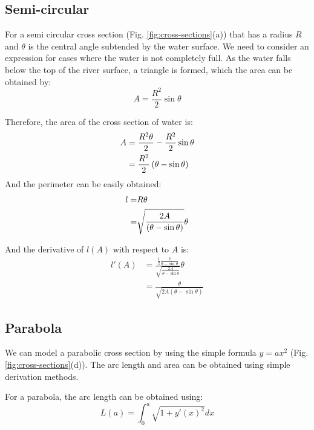 \documentclass[12pt]{article}
\begin{document}
\subsection{Semi-circular}
\label{appendix:semi-circular}
For a semi circular cross section (Fig. \ref{fig:cross-sections}(a)) that has a radius $R$ and $\theta$ is the central angle subtended by the water surface. We need to consider an expression for cases where the water is not completely full. As the water falls below the top of the river surface, a triangle is formed, which the area can be obtained by:
\begin{equation}
    A = \frac{R^2}{2} \sin\theta
\end{equation}

Therefore, the area of the cross section of water is:
\begin{align}
    A &=\frac{R^2 \theta}{2} - \frac{R^2}{2}\sin\theta \\
      &= \frac{R^2}{2}\left(\theta - \sin\theta\right) \notag
\end{align}
And the perimeter can be easily obtained:
\begin{align}
    l =& R\theta \\
        =& \sqrt{\frac{2A}{\left(\theta - \sin\theta\right)}}\theta \notag
\end{align}

And the derivative of $l(A)$ with respect to $A$ is:
\begin{equation}
    \begin{split}
         l'(A) &= \frac{\frac{1}{2}\frac{2}{\theta-\sin{\theta}}}{\sqrt{\frac{2A}{\theta-\sin{\theta}}}}\theta
        \\&= \frac{\theta}{\sqrt{2A(\theta-\sin{\theta})}}
    \end{split}
\end{equation}

\subsection{Parabola}
\label{appendix:parabola}
We can model a parabolic cross section by using the simple formula $y = ax^2$ (Fig. \ref{fig:cross-sections}(d)). The arc length and area can be obtained using simple derivation methods.

For a parabola, the arc length can be obtained using:
\begin{equation}
    L(a) = \int_0^a\sqrt{1 + y'(x)^2}dx
\end{equation}
\end{document}

